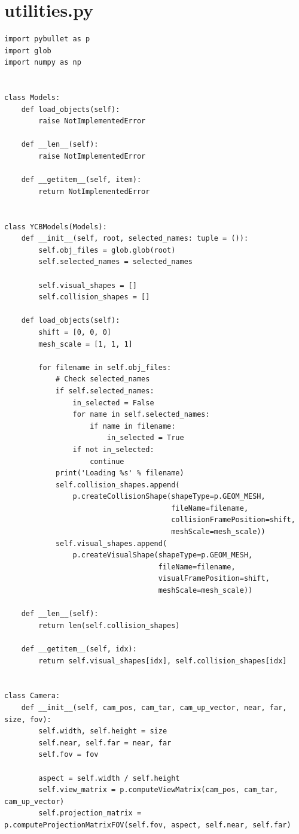\documentclass[11pt, a4paper]{report}
\begin{document}
\section{utilities.py}
\begin{lstlisting}
import pybullet as p
import glob
import numpy as np


class Models:
    def load_objects(self):
        raise NotImplementedError

    def __len__(self):
        raise NotImplementedError

    def __getitem__(self, item):
        return NotImplementedError


class YCBModels(Models):
    def __init__(self, root, selected_names: tuple = ()):
        self.obj_files = glob.glob(root)
        self.selected_names = selected_names

        self.visual_shapes = []
        self.collision_shapes = []

    def load_objects(self):
        shift = [0, 0, 0]
        mesh_scale = [1, 1, 1]

        for filename in self.obj_files:
            # Check selected_names
            if self.selected_names:
                in_selected = False
                for name in self.selected_names:
                    if name in filename:
                        in_selected = True
                if not in_selected:
                    continue
            print('Loading %s' % filename)
            self.collision_shapes.append(
                p.createCollisionShape(shapeType=p.GEOM_MESH,
                                       fileName=filename,
                                       collisionFramePosition=shift,
                                       meshScale=mesh_scale))
            self.visual_shapes.append(
                p.createVisualShape(shapeType=p.GEOM_MESH,
                                    fileName=filename,
                                    visualFramePosition=shift,
                                    meshScale=mesh_scale))

    def __len__(self):
        return len(self.collision_shapes)

    def __getitem__(self, idx):
        return self.visual_shapes[idx], self.collision_shapes[idx]


class Camera:
    def __init__(self, cam_pos, cam_tar, cam_up_vector, near, far, size, fov):
        self.width, self.height = size
        self.near, self.far = near, far
        self.fov = fov

        aspect = self.width / self.height
        self.view_matrix = p.computeViewMatrix(cam_pos, cam_tar, cam_up_vector)
        self.projection_matrix = p.computeProjectionMatrixFOV(self.fov, aspect, self.near, self.far)


\end{lstlisting}
\end{document}
